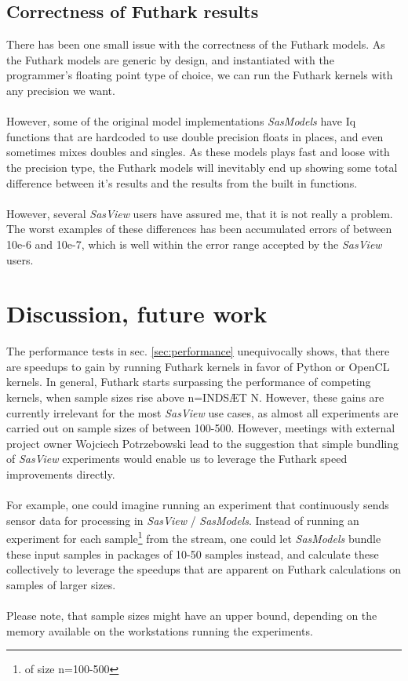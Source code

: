 \documentclass[11pt]{article}
\newcommand{\sasmodels}{\textit{SasModels}}
\newcommand{\sasview}{\textit{SasView}}
\begin{document}
\subsection{Correctness of Futhark results}
\label{sec:correctness}
There has been one small issue with the correctness of the Futhark models.
As the Futhark models are generic by design, and instantiated with the 
programmer's floating point type of choice, we can run the Futhark kernels
with any precision we want.
\\\\
However, some of the original model implementations \sasmodels{} have Iq functions that are 
hardcoded to use double precision floats in places, and even sometimes mixes
doubles and singles. 
As these models plays fast and loose with the precision type, the Futhark models
will inevitably end up showing some total difference between it's results and 
the results from the built in functions.
\\\\
However, several \sasview{} users have assured me, that it is not really a 
problem. The worst examples of these differences has been accumulated errors of
between 10e-6 and 10e-7, which is well within the error range accepted by 
the \sasview{} users.
\section{Discussion, future work}
\label{sec:discussion}
The performance tests in sec. \ref{sec:performance} unequivocally shows, that
there are speedups to gain by running Futhark kernels in favor of Python or
OpenCL kernels.
In general, Futhark starts surpassing the performance of competing kernels, when
sample sizes rise above n=INDSÆT N. However, these gains are currently
irrelevant for the most \sasview{} use cases, as almost all
experiments are carried out on sample sizes of between 100-500.
However, meetings with external project owner Wojciech Potrzebowski lead to the
suggestion that simple bundling of \sasview{} experiments would enable us
to leverage the Futhark speed improvements directly.
\\\\
For example, one could imagine running an experiment that continuously sends
sensor data for processing in \sasview{} / \sasmodels.
Instead of running an experiment for each sample\footnote{of size n=100-500}
from the stream, one could let \sasmodels{} bundle these input samples in packages
of 10-50 samples
instead, and calculate these collectively to leverage the speedups that are
apparent on Futhark calculations on samples of larger sizes.
\\\\
Please note, that sample sizes might have an upper bound, depending on the
memory available on the workstations running the experiments.
\end{document}
